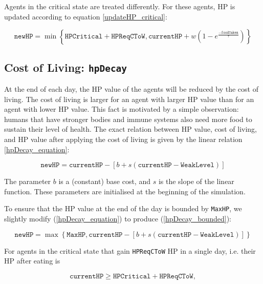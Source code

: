Agents in the critical state are treated differently. For these agents, HP is updated according to equation \eqref{updateHP_critical}:

\begin{equation}\label{updateHP_critical}
    \texttt{newHP} = \min\left\{\texttt{HPCritical}+\texttt{HPReqCToW}, \texttt{currentHP} +w(1-e^{\frac{-\texttt{foodTaken}}{\tau}})\right\}
\end{equation}

\subsection{Cost of Living: \texorpdfstring{\texttt{hpDecay}}{hpDecay}}\label{hpDecay}
At the end of each day, the HP value of the agents will be reduced by the cost of living. The cost of living is larger for an agent with larger HP value than for an agent with lower HP value. This fact is motivated by a simple observation: humans that have stronger bodies and immune systems also need more food to sustain their level of health. The exact relation between HP value, cost of living, and HP value after applying the cost of living is given by the linear relation \eqref{hpDecay_equation}:

\begin{equation}\label{hpDecay_equation}
    \texttt{newHP} = \texttt{currentHP}-\left[b + s(\texttt{currentHP}-\texttt{WeakLevel})\right]
\end{equation}


The parameter $b$ is a (constant) base cost, and $s$ is the slope of the linear function. These parameters are initialised at the beginning of the simulation.

To ensure that the HP value at the end of the day is bounded by \texttt{MaxHP}, we slightly modify (\ref{hpDecay_equation}) to produce (\ref{hpDecay_bounded}):

\begin{equation}\label{hpDecay_bounded}
    \texttt{newHP} =\max\left\{\texttt{MaxHP}, \texttt{currentHP}-\left[b + s(\texttt{currentHP}-\texttt{WeakLevel})\right]\right\}
\end{equation}

For agents in the critical state that gain \texttt{HPReqCToW} HP in a single day, i.e. their HP after eating is

\begin{equation}\label{HPReqCToW}
    \texttt{currentHP} \geq \texttt{HPCritical}+\texttt{HPReqCToW},
\end{equation}

